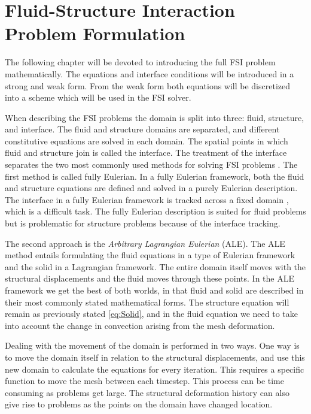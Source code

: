 \chapter{Fluid-Structure Interaction Problem Formulation}
The following chapter will be devoted to introducing the full FSI problem mathematically. The equations and interface conditions will be introduced in a strong and weak form. From the weak form both equations will be discretized into a scheme which will be used in the FSI solver. \newline

When describing the FSI problems the domain is split into three: fluid, structure, and interface. The fluid and structure domains are separated, and different constitutive equations are solved in each domain. The spatial points in which fluid and structure join is called the interface. The treatment of the interface separates the two most commonly used methods for solving FSI problems \cite{Liu2014}. The first method is called fully Eulerian. In a fully Eulerian framework, both the fluid and structure equations are defined and solved in a purely Eulerian description. The interface in a fully Eulerian framework is tracked across a fixed domain \cite{Valkov2015}, which is a difficult task. The fully Eulerian description is suited for fluid problems but is problematic for structure problems because of the interface tracking. \newline

The second approach is the \textit{Arbitrary Lagrangian Eulerian} (ALE).
The ALE method entails formulating the fluid equations in a type of Eulerian framework and the solid in a Lagrangian framework. The entire domain itself moves with the structural displacements and the fluid moves through these points. In the ALE framework we get the best of both worlds, in that fluid and solid are described in their most commonly stated mathematical forms. The structure equation will remain as previously stated \eqref{eq:Solid}, and in the fluid equation we need to take into account the change in convection arising from the mesh deformation. \newline

Dealing with the movement of the domain is performed in two ways. One way is to move the domain itself in relation to the structural displacements, and use this new domain to calculate the equations for every iteration. This requires a specific function to move the mesh between each timestep. This process can be time consuming as problems get large. The structural deformation history can also give rise to problems as the points on the domain have changed location. \newline


